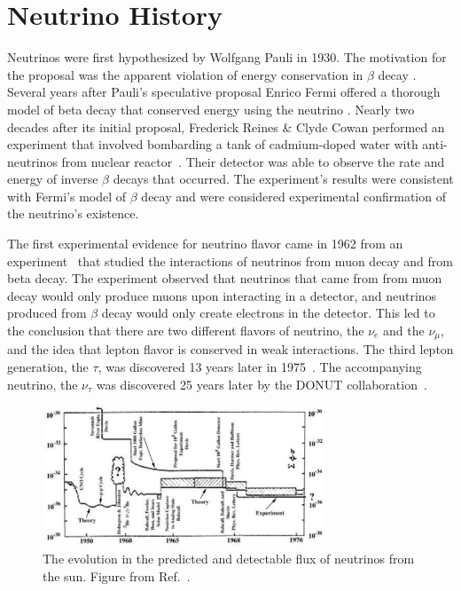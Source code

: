 \section{Neutrino History}
Neutrinos were first hypothesized by Wolfgang Pauli in 1930.
The motivation for the proposal was the apparent violation of energy
conservation in $\beta$ decay \citep{pauli_letter}.
Several years after Pauli's speculative proposal Enrico Fermi offered
a thorough model of beta decay that conserved energy using the neutrino
\citep{fermi_beta_decay}.
Nearly two decades after its initial proposal, Frederick Reines \&
Clyde Cowan performed an experiment that involved bombarding a tank of
cadmium-doped water with anti-neutrinos from nuclear
reactor~\citep{cowan_reines}.
Their detector was able to observe the rate and energy of inverse $\beta$
decays that occurred.
The experiment's results were consistent with Fermi's model of $\beta$ decay and were
considered experimental confirmation of the neutrino's existence.

The first experimental evidence for neutrino flavor came in 1962 from an
experiment~\citep{lederman_muon_flavor} that studied the interactions of
neutrinos from muon decay and 
from beta decay.
The experiment observed that neutrinos that came from from muon decay would only produce
muons upon interacting in a detector,
and neutrinos produced from $\beta$ decay would only create electrons in the
detector.
This led to the conclusion that there are two different flavors of neutrino,
the $\nu_e$ and the $\nu_{\mu}$, and the idea that lepton flavor is conserved in
weak interactions.
The third lepton generation, the $\tau$, was discovered 13
years later in 1975~\citep{tau_discovery}. The accompanying neutrino, the $\nu_\tau$
was discovered 25 years later by the DONUT collaboration~\cite{donut}.

\begin{figure}[htbp]
\centering
\includegraphics[width=0.75\textwidth]{bahcall_evolution}
\caption[Evolution of Solar Neutrino Predictions and Observations]{
The evolution in the predicted and detectable flux of neutrinos from the sun.
Figure from Ref.~\citep{bahcall_evolution}.}
\label{fig:solar_evolution_cartoon}
\end{figure}

